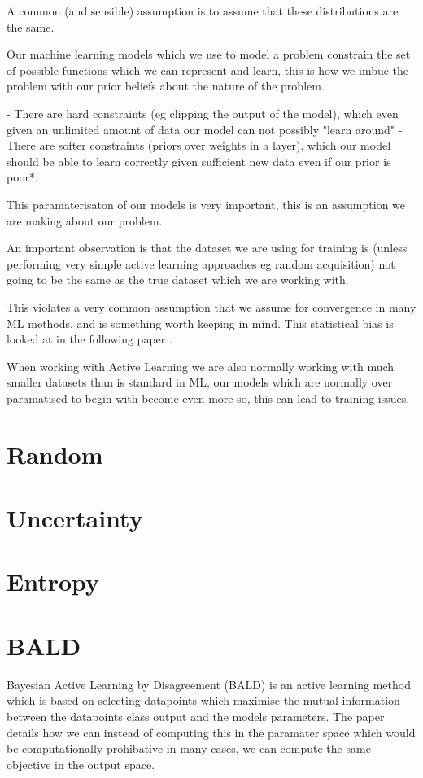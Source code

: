\documentclass[12pt, a4paper]{report}
\theoremstyle{definition}
\begin{document}
A common (and sensible) assumption is to assume that these distributions are the same.

Our machine learning models which we use to model a problem constrain the set of possible functions which we can represent and learn, this is how we imbue the problem with our prior beliefs about the nature of the problem.

- There are hard constraints (eg clipping the output of the model), which even given an unlimited amount of data our model can not possibly "learn around"
- There are softer constraints (priors over weights in a layer), which our model should be able to learn correctly given sufficient new data even if our prior is poor*.

This paramaterisaton of our models is very important, this is an assumption we are making about our problem.

An important observation is that the dataset we are using for training is (unless performing very simple active learning approaches eg random acquisition) not going to be the same as the true dataset which we are working with. 

This violates a very common assumption that we assume for convergence in many ML methods, and is something worth keeping in mind. This statistical bias is looked at in the following paper \cite{farquhar2021statistical}.

When working with Active Learning we are also normally working with much smaller datasets than is standard in ML, our models which are normally over paramatised to begin with become even more so, this can lead to training issues.

\section{Random}
\section{Uncertainty}
\section{Entropy}
\section{BALD}
Bayesian Active Learning by Disagreement (BALD) \cite{houlsby2011bayesian} is an active learning method which is based on selecting datapoints which maximise the mutual information between the datapoints class output and the models parameters. The paper details how we can instead of computing this in the paramater space which would be computationally prohibative in many cases, we can compute the same objective in the output space.
\end{document}
